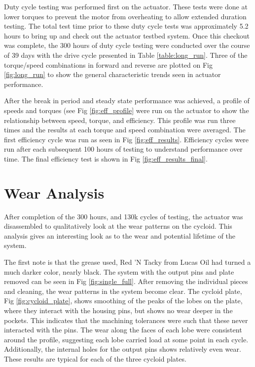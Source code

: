 Duty cycle testing was performed first on the actuator.
These tests were done at lower torques to prevent the motor from overheating to allow extended duration testing.
The total test time prior to these duty cycle tests was approximately 5.2 hours to bring up and check out the actuator testbed system.
Once this checkout was complete, the 300 hours of duty cycle testing were conducted over the course of 39  days with the drive cycle presented in Table \ref{table:long_run}.
Three of the torque/speed combinations in forward and reverse are plotted on Fig \ref{fig:long_run} to show the general characteristic trends seen in actuator performance.

After the break in period and steady state performance was achieved, a profile of speeds and torques (see Fig \ref{fig:eff_profile} were run on the actuator to show the relationship between speed, torque, and efficiency.
This profile was run three times and the results at each torque and speed combination were averaged. The first efficiency cycle was run as seen in Fig \ref{fig:eff_results}. Efficiency cycles were run after each subsequent 100 hours of testing to understand performance over time. The final efficiency test is shown in Fig \ref{fig:eff_results_final}.

\section{Wear Analysis} \label{ch:single:wear_analysis}

After completion of the 300 hours, and 130k cycles of testing, the actuator was disassembled to qualitatively look at the wear patterns on the cycloid. This analysis gives an interesting look as to the wear and potential lifetime of the system. 

The first note is that the grease used, Red 'N Tacky from Lucas Oil had turned a much darker color, nearly black. The system with the output pins and plate removed can be seen in Fig \ref{fig:single_full}. After removing the individual pieces and cleaning, the wear patterns in the system become clear. The cycloid plate, Fig \ref{fig:cycloid_plate}, shows smoothing of the peaks of the lobes on the plate, where they interact with the housing pins, but shows no wear deeper in the pockets. This indicates that the machining tolerances were such that these never interacted with the pins. The wear along the faces of each lobe were consistent around the profile, suggesting each lobe carried load at some point in each cycle. Additionally, the internal holes for the output pins shows relatively even wear. These results are typical for each of the three cycloid plates. 

